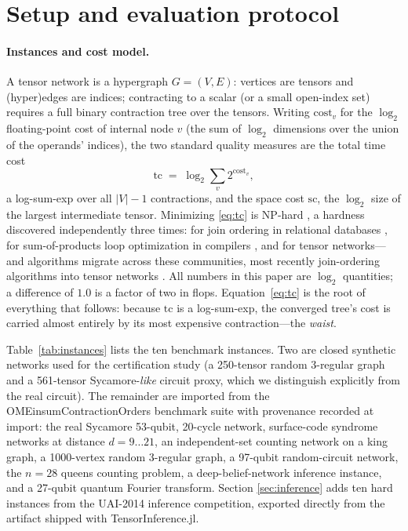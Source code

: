 \documentclass{SciPost}
\newcommand{\tc}{\ensuremath{\mathrm{tc}}}
\newcommand{\sct}{\ensuremath{\mathrm{sc}}}
\begin{document}
\section{Setup and evaluation protocol}
\label{sec:setup}

\paragraph{Instances and cost model.}
A tensor network is a hypergraph $G=(V,E)$: vertices are tensors and
(hyper)edges are indices; contracting to a scalar (or a small open-index
set) requires a full binary contraction tree over the tensors. Writing
$\mathrm{cost}_v$ for the $\log_2$ floating-point cost of internal node
$v$ (the sum of $\log_2$ dimensions over the union of the operands'
indices), the two standard quality measures are the total time cost
\begin{equation}
  \tc \;=\; \log_2 \sum_{v} 2^{\mathrm{cost}_v},
  \label{eq:tc}
\end{equation}
a log-sum-exp over all $|V|-1$ contractions, and the space cost $\sct$,
the $\log_2$ size of the largest intermediate tensor. Minimizing
\eqref{eq:tc} is NP-hard \cite{xu_2023_np}, a hardness discovered
independently three times: for join ordering in relational databases
\cite{ibaraki_1984_optimal}, for sum-of-products loop optimization in
compilers \cite{lam_1997_optimizing}, and for tensor networks---and
algorithms migrate across these communities, most recently join-ordering
algorithms into tensor networks \cite{stoian_2022_optimal}. All numbers
in this paper are $\log_2$ quantities; a difference of $1.0$ is a
factor of two in flops. Equation~\eqref{eq:tc} is the root of everything that follows:
because $\tc$ is a log-sum-exp, the converged tree's cost is carried
almost entirely by its most expensive contraction---the \emph{waist}.

Table~\ref{tab:instances} lists the ten benchmark instances. Two are
closed synthetic networks used for the certification study (a 250-tensor
random 3-regular graph and a 561-tensor Sycamore-\emph{like} circuit
proxy, which we distinguish explicitly from the real circuit). The
remainder are imported from the OMEinsumContractionOrders benchmark suite \cite{liu_2025_omeco_orders}
with provenance recorded at import: the real Sycamore 53-qubit,
20-cycle network, surface-code syndrome networks at distance
$d=9\ldots21$, an independent-set counting network on a king graph, a
1000-vertex random 3-regular graph, a 97-qubit random-circuit network,
the $n=28$ queens counting problem, a deep-belief-network inference
instance, and a 27-qubit quantum Fourier transform. Section
\ref{sec:inference} adds ten hard instances from the UAI-2014 inference
competition, exported directly from the artifact shipped with
TensorInference.jl.
\end{document}
